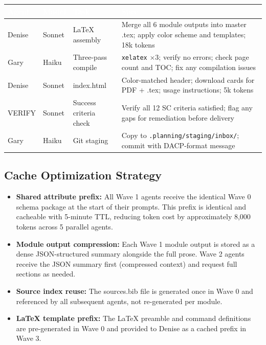 \documentclass[11pt,letterpaper]{article}
\newcommand{\tableheader}[1]{\textbf{\sffamily\textcolor{white}{#1}}}
\begin{document}
\begin{center}
\begin{tabularx}{\textwidth}{L{2.8cm}C{2cm}L{3.5cm}X}
\toprule
{}
\tableheader{Agent} & \tableheader{Model} & \tableheader{Task} & \tableheader{Spec} \\
\midrule
Denise & Sonnet & LaTeX assembly & Merge all 6 module outputs into master .tex; apply color scheme and templates; 18k tokens \\
Gary & Haiku & Three-pass compile & \texttt{xelatex} $\times 3$; verify no errors; check page count and TOC; fix any compilation issues \\
Denise & Sonnet & index.html & Color-matched header; download cards for PDF + .tex; usage instructions; 5k tokens \\
VERIFY & Sonnet & Success criteria check & Verify all 12 SC criteria satisfied; flag any gaps for remediation before delivery \\
Gary & Haiku & Git staging & Copy to \texttt{.planning/staging/inbox/}; commit with DACP-format message \\
\bottomrule
\end{tabularx}
\end{center}

\subsection{Cache Optimization Strategy}

\begin{itemize}[leftmargin=*]
  \item \textbf{Shared attribute prefix:} All Wave 1 agents receive the identical Wave 0 schema package at the start of their prompts. This prefix is identical and cacheable with 5-minute TTL, reducing token cost by approximately 8,000 tokens across 5 parallel agents.
  \item \textbf{Module output compression:} Each Wave 1 module output is stored as a dense JSON-structured summary alongside the full prose. Wave 2 agents receive the JSON summary first (compressed context) and request full sections as needed.
  \item \textbf{Source index reuse:} The sources.bib file is generated once in Wave 0 and referenced by all subsequent agents, not re-generated per module.
  \item \textbf{LaTeX template prefix:} The LaTeX preamble and command definitions are pre-generated in Wave 0 and provided to Denise as a cached prefix in Wave 3.
\end{itemize}
\end{document}
